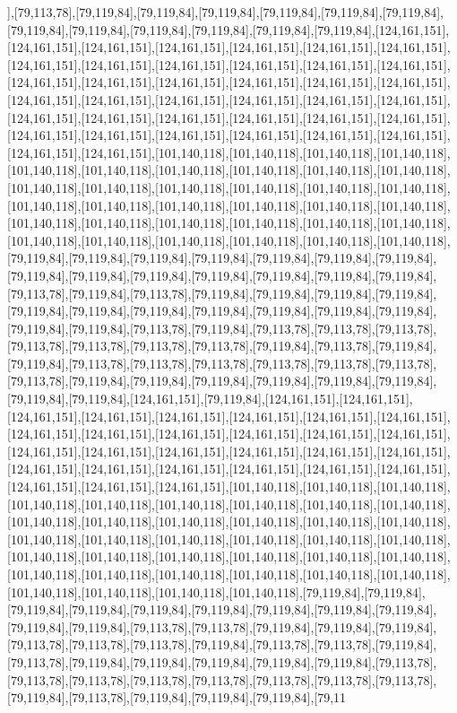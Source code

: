 ],[79,113,78],[79,119,84],[79,119,84],[79,119,84],[79,119,84],[79,119,84],[79,119,84],[79,119,84],[79,119,84],[79,119,84],[79,119,84],[79,119,84],[79,119,84],[124,161,151],[124,161,151],[124,161,151],[124,161,151],[124,161,151],[124,161,151],[124,161,151],[124,161,151],[124,161,151],[124,161,151],[124,161,151],[124,161,151],[124,161,151],[124,161,151],[124,161,151],[124,161,151],[124,161,151],[124,161,151],[124,161,151],[124,161,151],[124,161,151],[124,161,151],[124,161,151],[124,161,151],[124,161,151],[124,161,151],[124,161,151],[124,161,151],[124,161,151],[124,161,151],[124,161,151],[124,161,151],[124,161,151],[124,161,151],[124,161,151],[124,161,151],[124,161,151],[124,161,151],[124,161,151],[101,140,118],[101,140,118],[101,140,118],[101,140,118],[101,140,118],[101,140,118],[101,140,118],[101,140,118],[101,140,118],[101,140,118],[101,140,118],[101,140,118],[101,140,118],[101,140,118],[101,140,118],[101,140,118],[101,140,118],[101,140,118],[101,140,118],[101,140,118],[101,140,118],[101,140,118],[101,140,118],[101,140,118],[101,140,118],[101,140,118],[101,140,118],[101,140,118],[101,140,118],[101,140,118],[101,140,118],[101,140,118],[101,140,118],[101,140,118],[79,119,84],[79,119,84],[79,119,84],[79,119,84],[79,119,84],[79,119,84],[79,119,84],[79,119,84],[79,119,84],[79,119,84],[79,119,84],[79,119,84],[79,119,84],[79,119,84],[79,113,78],[79,119,84],[79,113,78],[79,119,84],[79,119,84],[79,119,84],[79,119,84],[79,119,84],[79,119,84],[79,119,84],[79,119,84],[79,119,84],[79,119,84],[79,119,84],[79,119,84],[79,119,84],[79,113,78],[79,119,84],[79,113,78],[79,113,78],[79,113,78],[79,113,78],[79,113,78],[79,113,78],[79,113,78],[79,119,84],[79,113,78],[79,119,84],[79,119,84],[79,113,78],[79,113,78],[79,113,78],[79,113,78],[79,113,78],[79,113,78],[79,113,78],[79,119,84],[79,119,84],[79,119,84],[79,119,84],[79,119,84],[79,119,84],[79,119,84],[79,119,84],[124,161,151],[79,119,84],[124,161,151],[124,161,151],[124,161,151],[124,161,151],[124,161,151],[124,161,151],[124,161,151],[124,161,151],[124,161,151],[124,161,151],[124,161,151],[124,161,151],[124,161,151],[124,161,151],[124,161,151],[124,161,151],[124,161,151],[124,161,151],[124,161,151],[124,161,151],[124,161,151],[124,161,151],[124,161,151],[124,161,151],[124,161,151],[124,161,151],[124,161,151],[124,161,151],[124,161,151],[101,140,118],[101,140,118],[101,140,118],[101,140,118],[101,140,118],[101,140,118],[101,140,118],[101,140,118],[101,140,118],[101,140,118],[101,140,118],[101,140,118],[101,140,118],[101,140,118],[101,140,118],[101,140,118],[101,140,118],[101,140,118],[101,140,118],[101,140,118],[101,140,118],[101,140,118],[101,140,118],[101,140,118],[101,140,118],[101,140,118],[101,140,118],[101,140,118],[101,140,118],[101,140,118],[101,140,118],[101,140,118],[101,140,118],[101,140,118],[101,140,118],[101,140,118],[101,140,118],[79,119,84],[79,119,84],[79,119,84],[79,119,84],[79,119,84],[79,119,84],[79,119,84],[79,119,84],[79,119,84],[79,119,84],[79,119,84],[79,113,78],[79,113,78],[79,119,84],[79,119,84],[79,119,84],[79,113,78],[79,113,78],[79,113,78],[79,119,84],[79,113,78],[79,113,78],[79,119,84],[79,113,78],[79,119,84],[79,119,84],[79,119,84],[79,119,84],[79,119,84],[79,113,78],[79,113,78],[79,113,78],[79,113,78],[79,113,78],[79,113,78],[79,113,78],[79,113,78],[79,119,84],[79,113,78],[79,119,84],[79,119,84],[79,119,84],[79,11